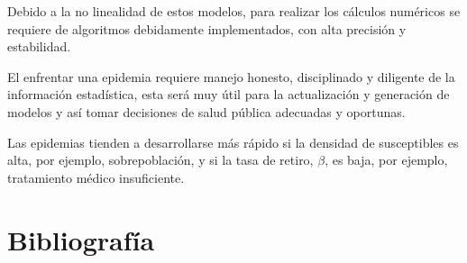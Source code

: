 \documentclass[a4paper, 10pt, twoside]{article}
\begin{document}
Debido a la no linealidad de estos modelos, para realizar los cálculos numéricos se requiere
de algoritmos debidamente implementados, con alta precisión y estabilidad.

El enfrentar una epidemia requiere manejo honesto, disciplinado y diligente de la información 
estadística, esta será muy útil para la actualización y generación de modelos y así tomar 
decisiones de salud pública adecuadas y oportunas.

Las epidemias tienden a desarrollarse más rápido si la densidad de susceptibles es alta, por 
ejemplo, sobrepoblación, y si la tasa de retiro, $\beta$, es baja, por ejemplo, tratamiento médico 
insuficiente.

\clearpage
\textcite{accu_stab_num_alg, fun_ergo_theo, pde_evans, trans_equ_bio_2007, 
	real_comp_ana_1987, func_ana_1987}

\section{Bibliografía}
\printbibliography[heading = none]
 
\end{document}
